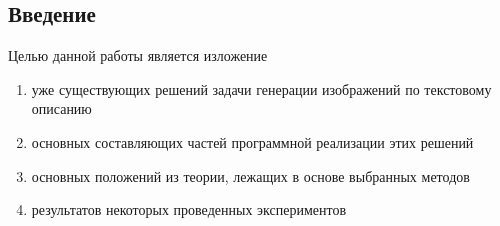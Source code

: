 \documentclass{article}
\begin{document}
    \newpage
    \begin{center} 
    \section{Введение}
    \end{center}
    \large 
    Целью данной работы является изложение
    \begin{enumerate} 
    \item уже существующих решений задачи генерации изображений по текстовому
    описанию
    \item основных составляющих частей программной реализации этих решений
    \item основных положений из теории, лежащих в основе выбранных методов
    \item результатов некоторых проведенных экспериментов
    \end{enumerate} 
    \\
    
\end{document}

